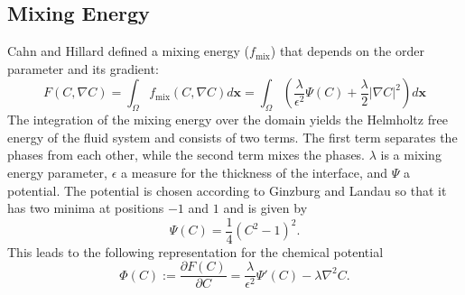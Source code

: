 \subsection{Mixing Energy}
Cahn and Hillard defined a mixing energy ($f_{\text{mix}}$) that depends on the order parameter and its gradient:
\begin{equation}
    F(C, \nabla C) = \int_{\Omega} f_{\mathrm{mix}} (C, \nabla C) d\textbf{x} = \int_{\Omega}\left(\frac{\lambda}{\epsilon^2}\Psi(C)+\frac{\lambda}{2}\vert\nabla C\vert^2\right)d\textbf{x}
\end{equation}
The integration of the mixing energy over the domain yields the Helmholtz free energy of the fluid system and consists of two terms. The first term separates the phases from each other, while the second term mixes the phases. $\lambda$ is a mixing energy parameter, $\epsilon$ a measure for the thickness of the interface, and $\Psi$ a potential. The potential is chosen according to Ginzburg and Landau so that it has two minima at positions $-1$ and $1$ and is given by 
\begin{equation}
    \Psi(C)= \frac{1}{4}\left(C^2-1\right)^2.
\end{equation}
This leads to the following representation for the chemical potential 
\begin{equation}
    \label{eq: chempotentialMIXING_pahseFieldMethod}
    \Phi(C):= \frac{\partial F(C)}{\partial C} = \frac{\lambda}{\epsilon^2}\Psi'(C)-\lambda\nabla^2C.
\end{equation}

